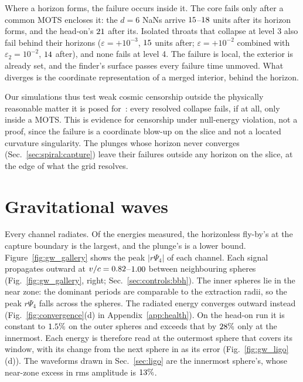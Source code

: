 \documentclass[twocolumn,floatfix,aps,prd,superscriptaddress,nofootinbib]{revtex4-2}
\begin{document}
Where a horizon forms, the failure occurs inside it. The core fails only after a common MOTS encloses it: the $d=6$ NaNs arrive $15$--$18$ units after its horizon forms, and the head-on's $21$ after its. Isolated throats that collapse at level 3 also fail behind their horizons ($\varepsilon=+10^{-3}$, $15$ units after; $\varepsilon=+10^{-2}$ combined with $\varepsilon_2=10^{-2}$, $14$ after), and none fails at level 4. The failure is local, the exterior is already set, and the finder's surface passes every failure time unmoved. What diverges is the coordinate representation of a merged interior, behind the horizon.

Our simulations thus test weak cosmic censorship outside the physically reasonable matter it is posed for~\cite{penrose1969,wald1997}: every resolved collapse fails, if at all, only inside a MOTS. This is evidence for censorship under null-energy violation, not a proof, since the failure is a coordinate blow-up on the slice and not a located curvature singularity. The plunges whose horizon never converges (Sec.~\ref{sec:spiral:capture}) leave their failures outside any horizon on the slice, at the edge of what the grid resolves.

\section{Gravitational waves}
\label{sec:gw}

Every channel radiates. Of the energies measured, the horizonless fly-by's at the capture boundary is the largest, and the plunge's is a lower bound. Figure~\ref{fig:gw_gallery} shows the peak $|r\Psi_4|$ of each channel. Each signal propagates outward at $v/c=0.82$--$1.00$ between neighbouring spheres (Fig.~\ref{fig:gw_gallery}, right; Sec.~\ref{sec:controls:bbh}). The inner spheres lie in the near zone: the dominant periods are comparable to the extraction radii, so the peak $r\Psi_4$ falls across the spheres. The radiated energy converges outward instead (Fig.~\ref{fig:convergence}(d) in Appendix~\ref{app:health}). On the head-on run it is constant to $1.5\%$ on the outer spheres and exceeds that by $28\%$ only at the innermost. Each energy is therefore read at the outermost sphere that covers its window, with its change from the next sphere in as its error (Fig.~\ref{fig:gw_ligo}(d)). The waveforms drawn in Sec.~\ref{sec:ligo} are the innermost sphere's, whose near-zone excess in rms amplitude is $13\%$.
\end{document}
